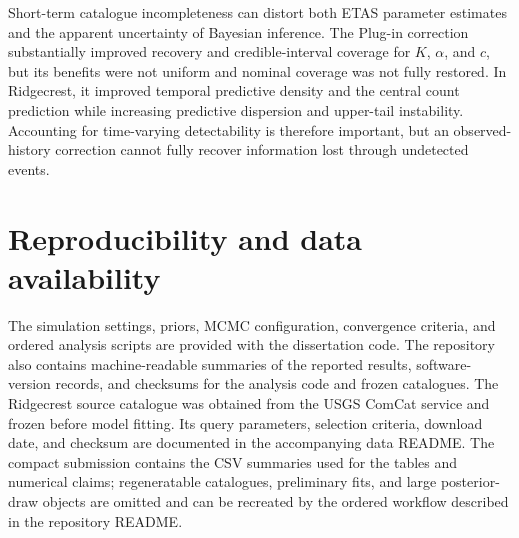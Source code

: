 \documentclass{statsmsc}
\begin{document}
Short-term catalogue incompleteness can distort both ETAS parameter estimates
and the apparent uncertainty of Bayesian inference. The Plug-in correction
substantially improved recovery and credible-interval coverage for
\(K\), \(\alpha\), and \(c\), but its benefits were not uniform and nominal
coverage was not fully restored. In Ridgecrest, it improved temporal
predictive density and the central count prediction while increasing
predictive dispersion and upper-tail instability. Accounting for
time-varying detectability is therefore important, but an observed-history
correction cannot fully recover information lost through undetected events.

\clearpage
\section{Reproducibility and data availability}

The simulation settings, priors, MCMC configuration, convergence criteria,
and ordered analysis scripts are provided with the dissertation code. The
repository also contains machine-readable summaries of the reported results,
software-version records, and checksums for the analysis code and frozen
catalogues. The Ridgecrest source catalogue was obtained from the USGS ComCat
service and frozen before model fitting. Its query parameters, selection
criteria, download date, and checksum are documented in the accompanying data
README. The compact submission contains the CSV summaries used for the tables
and numerical claims; regeneratable catalogues, preliminary fits, and large
posterior-draw objects are omitted and can be recreated by the ordered
workflow described in the repository README.

%
%
%
%
%
%

%

\clearpage
{}
\renewcommand*{\thepage}{References | Page \arabic{page}}



\end{document}
